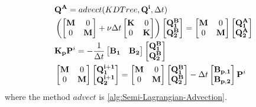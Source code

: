 \begin{align}
	&\mathbf{Q^A} = advect(KDTree, \mathbf{Q^{i}}, \Delta t) \label{eq:adv-diff-split-advect}\\
		&\left(\begin{bmatrix}
		\mathbf{M} & 0 \\
		0 & \mathbf{M}
	\end{bmatrix} + \nu\Delta t\begin{bmatrix}
		\mathbf{K} & 0 \\
		0 & \mathbf{K}
	\end{bmatrix}\right)\begin{bmatrix}
		\mathbf{Q^{B}_1} \\
		\mathbf{Q^{B}_2}
	\end{bmatrix} = \begin{bmatrix}
		\mathbf{M} & 0 \\
		0 & \mathbf{M}
	\end{bmatrix}\begin{bmatrix}
		\mathbf{Q^{A}_1} \\
		\mathbf{Q^{A}_2}
	\end{bmatrix} \label{eq:adv-diff-split-diffuse}\\
	&\mathbf{K_p}\mathbf{P}^i = -\frac{1}{\Delta t} \begin{bmatrix}
		\mathbf{B_1} & \mathbf{B_2}
	\end{bmatrix} \begin{bmatrix}
		\mathbf{Q^{B}_1} \\
		\mathbf{Q^{B}_2}
	\end{bmatrix} \label{eq:adv-diff-split-pressure}\\
	&\begin{bmatrix}
		\mathbf{M} & 0 \\
		0 & \mathbf{M}
	\end{bmatrix} \begin{bmatrix}
		\mathbf{Q^{i+1}_1} \\
		\mathbf{Q^{i+1}_2}
	\end{bmatrix} =	\begin{bmatrix}
		\mathbf{M} & 0 \\
		0 & \mathbf{M}
	\end{bmatrix} \begin{bmatrix}
		\mathbf{Q^{B}_1} \\
		\mathbf{Q^{B}_2}
	\end{bmatrix} - \Delta t \begin{bmatrix}
		\mathbf{B_{p,1}} \\
		\mathbf{B_{p,2}}
	\end{bmatrix} \mathbf{P}^i \label{eq:adv-diff-split-velicity-mass}
\end{align}
where the method $advect$ is \cref{alg:Semi-Lagrangian-Advection}.


